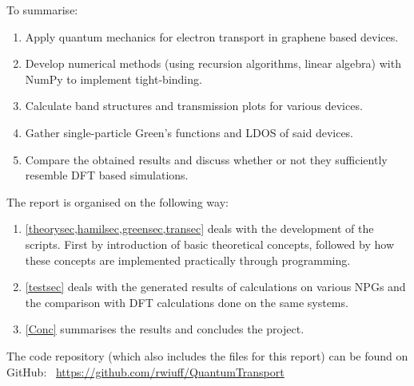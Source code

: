 To summarise:
\begin{enumerate}
	\item Apply quantum mechanics for electron transport in graphene based devices.
	\item Develop numerical methods (using recursion algorithms, linear algebra) with NumPy to implement tight-binding.
	\item Calculate band structures and transmission plots for various devices.
	\item Gather single-particle Green’s functions and LDOS of said devices.
	\item Compare the obtained results and discuss whether or not they sufficiently resemble DFT based simulations.
\end{enumerate}
The report is organised on the following way:
\begin{enumerate}
	\item \cref{theorysec,hamilsec,greensec,transec} deals with the development of the scripts. First by introduction of basic theoretical concepts, followed by how these concepts are implemented practically through programming.
	\item \cref{testsec} deals with the generated results of calculations on various NPGs and the comparison with DFT calculations done on the same systems.
	\item \cref{Conc} summarises the results and concludes the project.
\end{enumerate}
The code repository (which also includes the \latex files for this report) can be found on GitHub: \faGithub \ \url{https://github.com/rwiuff/QuantumTransport}
